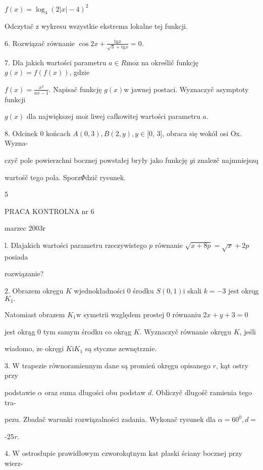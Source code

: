 \documentclass[a4paper,12pt]{article}
\begin{document}
$f(x)=\log_{4}(2|x|-4)^{2}$

Odczytač $\mathrm{z}$ wykresu wszystkie ekstrema lokalne tej funkcji.

6. Rozwiązač równanie $\displaystyle \cos 2x+\frac{\mathrm{t}\mathrm{g}x}{\sqrt{3}+\mathrm{t}\mathrm{g}x}=0.$

7. Dla jakich wartości parametru $a\in R\mathrm{m}\mathrm{o}\dot{\mathrm{z}}$ na określič funkcję $g(x)=f(f(x))$, gdzie

$f(x)=\displaystyle \frac{x^{2}}{ax-1}$. Napisač funkcję $g(x)\mathrm{w}$ jawnej postaci. Wyznaczyč asymptoty funkcji

$g(x)$ dla największej $\mathrm{m}\mathrm{o}\dot{\mathrm{z}}$ liwej cafkowitej wartości parametru $a.$

8. Odcinek $0$ końcach $A(0,3), B(2,y), y \in [0$, 3$]$, obraca się wokół osi Ox. Wyzna-

czyč pole powierzchni bocznej powstałej bryły jako funkcję $y\mathrm{i}$ znalez$\acute{}$č najmniejszq

wartośč tego pola. Sporz$\Phi$dzič rysunek.

5





PRACA KONTROLNA nr 6

marzec $2003\mathrm{r}$

l. Dlajakich wartości parametru rzeczywistego $p$ równanie $\sqrt{x+8p}=\sqrt{x}+2p$ posiada

rozwiązanie?

2. Obrazem okręgu $K$ wjednokładności $0$ środku $S(0,1)\mathrm{i}$ skali $k=-3$ jest okrqg $K_{1}.$

Natomiast obrazem $K_{1} \mathrm{w}$ symetrii względem prostej $0$ równaniu $2x+y+3 = 0$

jest okrąg $0$ tym samym środku co okrąg $K$. Wyznaczyč równanie okręgu $K$, jeśli

wiadomo, $\dot{\mathrm{z}}\mathrm{e}$ okręgi $K\mathrm{i}K_{1}$ są styczne zewnętrznie.

3. $\mathrm{W}$ trapezie równoramiennym dane są promień okręgu opisanego $r$, kąt ostry przy

podstawie $\alpha$ oraz suma długości obu podstaw $d$. Obliczyč dlugośč ramienia tego tra-

pezu. Zbadač warunki rozwiązalności zadania. Wykonač rysunek dla $\alpha=60^{0}, d=$

-25{\it r}.

4. $\mathrm{W}$ ostrosłupie prawidłowym czworokqtnym $\mathrm{k}\mathrm{a}\mathrm{t}$ płaski ściany bocznej przy wierz-
\end{document}

